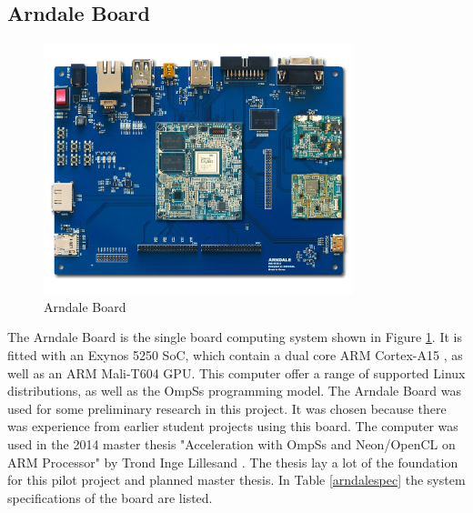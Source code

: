\subsection{Arndale Board} \label{ArndaleBoard}
\begin{figure}[ht!]
  \centering
  \includegraphics[width=90mm]{fig/Arendale.jpg}
  \caption{Arndale Board \label{ArndaleBoardImage}}
\end{figure}
The Arndale Board is the single board computing system shown in Figure \ref{ArndaleBoardImage}.
It is fitted with an Exynos 5250 SoC, which contain a dual core ARM Cortex-A15 , as well as an ARM Mali-T604 GPU.
This computer offer a range of supported Linux distributions, as well as the OmpSs programming model.
The Arndale Board was used for some preliminary research in this project.
It was chosen because there was experience from earlier student projects using this board.
The computer was used in the 2014 master thesis "Acceleration with OmpSs and Neon/OpenCL on ARM Processor" by Trond Inge Lillesand \cite{lillesand13}.
The thesis lay a lot of the foundation for this pilot project and planned master thesis.
In Table \ref{arndalespec} the system specifications of the board are listed.

